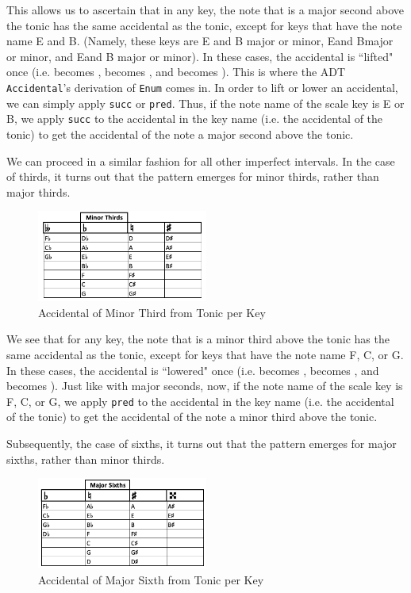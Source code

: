 \documentclass{report}
\begin{document}
This allows us to ascertain that in any key, the note that is a major second above the tonic has the same accidental as the tonic, except for keys that have the note name E and B. (Namely, these keys are E and B major or minor, E\musFlat and B\musFlat major or minor, and E\musSharp and B \musSharp major or minor). In these  cases, the accidental is ``lifted" once  (i.e. \musFlat becomes \musNatural, \musNatural becomes \musSharp, and \musSharp becomes \musDoubleSharp). This is where the ADT \verb.Accidental.'s derivation of \verb.Enum. comes in. In order to lift or lower an accidental, we can simply apply \verb.succ. or \verb.pred.. Thus, if the note name of the scale key is E or B, we apply \verb.succ. to the accidental in the key name (i.e. the accidental of the tonic) to get the accidental of the note a major second above the tonic. 

We can proceed in a similar fashion for all other imperfect intervals. In the case of thirds, it turns out that the pattern emerges for minor thirds, rather than major thirds.

\begin{figure}[h!]
\centering
\includegraphics[width=0.5\textwidth]{images/min_thirds}
\caption{Accidental of Minor Third from Tonic per Key}
\label{min_thirds}
\end{figure}

We see that for any key, the note that is a minor third above the tonic has the same accidental as the tonic, except for keys that have the note name F,  C, or G. In these  cases, the accidental is ``lowered" once  (i.e. \musFlat becomes \musDoubleFlat, \musNatural becomes \musFlat, and \musSharp becomes \musFlat). Just like with major seconds, now, if the note name of the scale key is F, C, or G, we apply \verb.pred. to the accidental in the key name (i.e. the accidental of the tonic) to get the accidental of the note a minor third above the tonic.

Subsequently, the case of sixths, it turns out that the pattern emerges for major sixths, rather than minor thirds.

\begin{figure}[h!]
\centering
\includegraphics[width=0.5\textwidth]{images/maj_sixths}
\caption{Accidental of Major Sixth from Tonic per Key}
\label{maj_sixths}
\end{figure}
\end{document}
